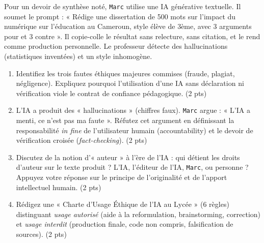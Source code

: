 \documentclass[11pt]{article}
\begin{document}
\begin{exercice}
Pour un devoir de synthèse noté, \texttt{Marc} utilise une IA générative textuelle. Il soumet le prompt : « Rédige une dissertation de 500 mots sur l'impact du numérique sur l'éducation au Cameroun, style élève de 3ème, avec 3 arguments pour et 3 contre ». Il copie-colle le résultat sans relecture, sans citation, et le rend comme production personnelle. Le professeur détecte des hallucinations (statistiques inventées) et un style inhomogène.
\begin{enumerate}
    \item Identifiez les trois fautes éthiques majeures commises (fraude, plagiat, négligence). Expliquez pourquoi l'utilisation d'une IA sans déclaration ni vérification viole le contrat de confiance pédagogique. (2 pts)
    \item L'IA a produit des « hallucinations » (chiffres faux). \texttt{Marc} argue : « L'IA a menti, ce n'est pas ma faute ». Réfutez cet argument en définissant la responsabilité \textit{in fine} de l'utilisateur humain (accountability) et le devoir de vérification croisée (\textit{fact-checking}). (2 pts)
    \item Discutez de la notion d'« auteur » à l'ère de l'IA : qui détient les droits d'auteur sur le texte produit ? L'IA, l'éditeur de l'IA, \texttt{Marc}, ou personne ? Appuyez votre réponse sur le principe de l'originalité et de l'apport intellectuel humain. (2 pts)
    \item Rédigez une « Charte d'Usage Éthique de l'IA au Lycée » (6 règles) distinguant \textit{usage autorisé} (aide à la reformulation, brainstorming, correction) et \textit{usage interdit} (production finale, code non compris, falsification de sources). (2 pts)
\end{enumerate}
\end{exercice}
\end{document}
